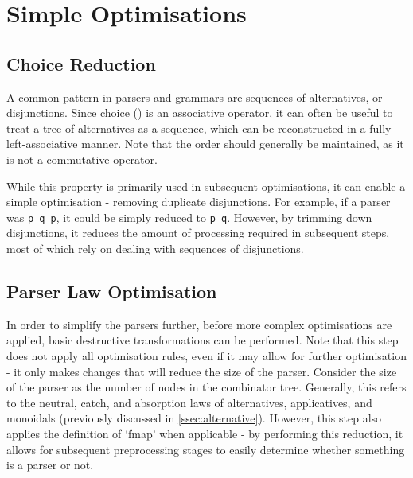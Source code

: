 \section{Simple Optimisations}
\label{sec:simple_opt}

\subsection{Choice Reduction}
\label{ssec:choice_reduce}

A common pattern in parsers and grammars are sequences of alternatives, or disjunctions.
Since choice (\texttt{\choice}) is an associative operator, it can often be useful to treat a tree of alternatives as a sequence, which can be reconstructed in a fully left-associative manner.
Note that the order should generally be maintained, as it is not a commutative operator.

While this property is primarily used in subsequent optimisations, it can enable a simple optimisation - removing duplicate disjunctions.
For example, if a parser was \texttt{p \choice q \choice p}, it could be simply reduced to \texttt{p \choice q}.
However, by trimming down disjunctions, it reduces the amount of processing required in subsequent steps, most of which rely on dealing with sequences of disjunctions.

\subsection{Parser Law Optimisation}
\label{ssec:parser_law}

In order to simplify the parsers further, before more complex optimisations are applied, basic destructive transformations can be performed.
Note that this step does not apply all optimisation rules, even if it may allow for further optimisation - it only makes changes that will reduce the size of the parser.
Consider the size of the parser as the number of nodes in the combinator tree.
Generally, this refers to the neutral, catch, and absorption laws of alternatives, applicatives, and monoidals (previously discussed in \autoref{ssec:alternative}).
However, this step also applies the definition of `fmap' when applicable - by performing this reduction, it allows for subsequent preprocessing stages to easily determine whether something is a parser or not.
